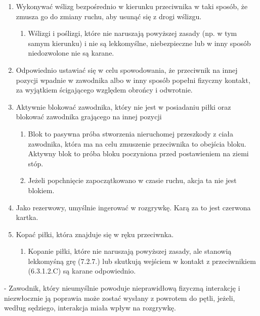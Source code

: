 \documentclass[12pt]{article}
\newcommand\other{\bgroup\color{green}\markoverwith{\textcolor{green}{\rule[-0.5ex]{2pt}{0.4pt}}}\ULon}
\begin{document}
\begin{enumerate}
	\item
	      Wykonywać wślizg bezpośrednio w kierunku przeciwnika w taki sposób, że
	      zmusza go do zmiany ruchu, aby usunąć się z drogi wślizgu.

	      \begin{enumerate}
		      \item
		            Wślizgi i poślizgi, które nie naruszają powyższej zasady (np. w tym
		            samym kierunku) i nie są lekkomyślne, niebezpieczne lub w inny
		            sposób niedozwolone nie są karane.
	      \end{enumerate}
	\item
	      Odpowiednio ustawiać się w celu spowodowania, że przeciwnik na innej
	      pozycji wpadnie w zawodnika albo w inny sposób popełni fizyczny
	      kontakt, za wyjątkiem ścigającego względem obrońcy i odwrotnie.
	\item
	      Aktywnie blokować zawodnika, który nie jest w posiadaniu piłki oraz
	      blokować zawodnika grającego na innej pozycji

	      \begin{enumerate}
		      \item
		            Blok to pasywna próba stworzenia nieruchomej przeszkody z ciała
		            zawodnika, która ma na celu zmuszenie przeciwnika to obejścia bloku.
		            Aktywny blok to próba bloku poczyniona przed postawieniem na ziemi
		            stóp.
		      \item
		            Jeżeli popchnięcie zapoczątkowano w czasie ruchu, akcja ta nie jest
		            blokiem.
	      \end{enumerate}
	\item
	      Jako rezerwowy, umyślnie ingerować w rozgrywkę. Karą za to jest
	      czerwona kartka.
	\item
	      Kopać piłki, która znajduje się w ręku przeciwnka.

	      \begin{enumerate}
		      \item
		            Kopanie piłki, które nie naruszają powyższej zasady, ale stanowią
		            lekkomyśną grę (7.2.7.) lub skutkują wejściem w kontakt z
		            przeciwnikiem (6.3.1.2.C) są karane odpowiednio.
	      \end{enumerate}
\end{enumerate}

\other{Powrót do pętli} - Zawodnik, który nieumyślnie powoduje
nieprawidłową fizyczną interakcję i niezwłocznie ją poprawia może zostać
wysłany z powrotem do pętli, jeżeli, według sędziego, interakcja miała
wpływ na rozgrywkę.
\end{document}
